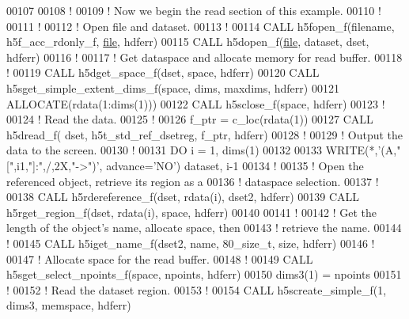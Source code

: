 \begin{DoxyCode}
00107 
00108   \textcolor{comment}{!}
00109   \textcolor{comment}{! Now we begin the read section of this example.}
00110   \textcolor{comment}{!}
00111   \textcolor{comment}{!}
00112   \textcolor{comment}{! Open file and dataset.}
00113   \textcolor{comment}{!}
00114   \textcolor{keyword}{CALL }h5fopen\_f(filename, h5f\_acc\_rdonly\_f, \hyperlink{structfile}{file}, hdferr)
00115   \textcolor{keyword}{CALL }h5dopen\_f(\hyperlink{structfile}{file}, dataset, dset, hdferr)
00116   \textcolor{comment}{!}
00117   \textcolor{comment}{! Get dataspace and allocate memory for read buffer.}
00118   \textcolor{comment}{!}
00119   \textcolor{keyword}{CALL }h5dget\_space\_f(dset, space, hdferr)
00120   \textcolor{keyword}{CALL }h5sget\_simple\_extent\_dims\_f(space, dims, maxdims, hdferr)
00121   \textcolor{keyword}{ALLOCATE}(rdata(1:dims(1)))
00122   \textcolor{keyword}{CALL }h5sclose\_f(space, hdferr)
00123   \textcolor{comment}{!}
00124   \textcolor{comment}{! Read the data.}
00125   \textcolor{comment}{!}
00126   f\_ptr = c\_loc(rdata(1))
00127   \textcolor{keyword}{CALL }h5dread\_f( dset, h5t\_std\_ref\_dsetreg, f\_ptr, hdferr)
00128   \textcolor{comment}{!}
00129   \textcolor{comment}{! Output the data to the screen.}
00130   \textcolor{comment}{!}
00131   \textcolor{keywordflow}{DO} i = 1, dims(1)
00132      
00133      \textcolor{keyword}{WRITE}(*,\textcolor{stringliteral}{'(A,"[",i1,"]:",/,2X,"->")'}, advance=\textcolor{stringliteral}{'NO'}) dataset, i-1
00134      \textcolor{comment}{!}
00135      \textcolor{comment}{! Open the referenced object, retrieve its region as a}
00136      \textcolor{comment}{! dataspace selection.}
00137      \textcolor{comment}{!}
00138      \textcolor{keyword}{CALL }h5rdereference\_f(dset, rdata(i), dset2, hdferr)
00139      \textcolor{keyword}{CALL }h5rget\_region\_f(dset, rdata(i), space, hdferr)
00140   
00141      \textcolor{comment}{!}
00142      \textcolor{comment}{! Get the length of the object's name, allocate space, then}
00143      \textcolor{comment}{! retrieve the name.}
00144      \textcolor{comment}{!}
00145      \textcolor{keyword}{CALL }h5iget\_name\_f(dset2, name, 80\_size\_t, \textcolor{keyword}{size}, hdferr)
00146      \textcolor{comment}{!}
00147      \textcolor{comment}{! Allocate space for the read buffer.}
00148      \textcolor{comment}{!}
00149      \textcolor{keyword}{CALL }h5sget\_select\_npoints\_f(space, npoints, hdferr)
00150      dims3(1) = npoints
00151      \textcolor{comment}{!}
00152      \textcolor{comment}{! Read the dataset region.}
00153      \textcolor{comment}{!}
00154      \textcolor{keyword}{CALL }h5screate\_simple\_f(1, dims3, memspace, hdferr)

\end{DoxyCode}
